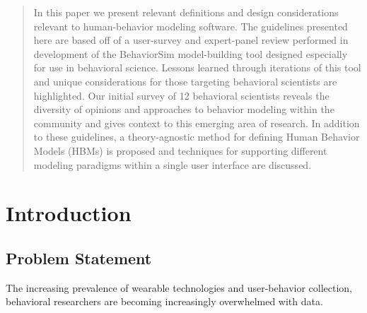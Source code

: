 \documentclass[conference]{IEEEtran}
\begin{document}




\maketitle


\begin{abstract}
In this paper we present relevant definitions and design considerations relevant to human-behavior modeling software. 
The guidelines presented here are based off of a user-survey and expert-panel review performed in development of the BehaviorSim model-building tool designed especially for use in behavioral science. 
Lessons learned through iterations of this tool and unique considerations for those targeting behavioral scientists are highlighted. 
Our initial survey of 12 behavioral scientists reveals the diversity of opinions and approaches to behavior modeling within the community and gives context to this emerging area of research. 
In addition to these guidelines, a theory-agnostic method for defining Human Behavior Models (HBMs) is proposed and techniques for supporting different modeling paradigms within a single user interface are discussed. 
\end{abstract}





%
\IEEEpeerreviewmaketitle

\section{Introduction}
\subsection{Problem Statement}
The increasing prevalence of wearable technologies and user-behavior collection, behavioral researchers are becoming increasingly overwhelmed with data.
\end{document}
